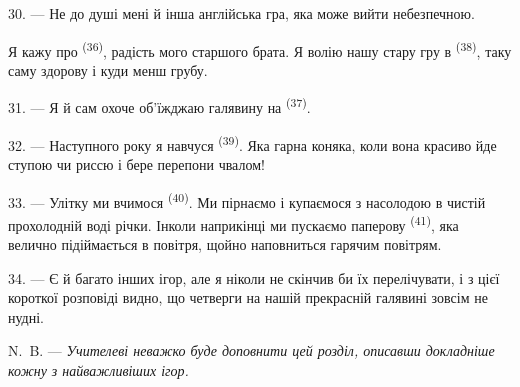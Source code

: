 30. --- Не до душі мені й інша англійська гра, яка може вийти небезпечною.

Я кажу про  \textsuperscript{(36)}, радість мого старшого брата.
Я волію нашу стару гру в  \textsuperscript{(38)}, таку саму
здорову і куди менш грубу.

\VUsaut{4.6mm}
\VUsaut{3.0mm}

31. --- Я й сам охоче об'їжджаю галявину на 
\textsuperscript{(37)}.

32. --- Наступного року я навчуся  \textsuperscript{(39)}.
Яка гарна коняка, коли вона красиво йде ступою чи риссю і бере перепони чвалом!

33. --- Улітку ми вчимося  \textsuperscript{(40)}. Ми пірнаємо і
купаємося з насолодою в чистій прохолодній воді річки. Інколи наприкінці ми
пускаємо паперову  \textsuperscript{(41)}, яка велично підіймається
в повітря, щойно наповниться гарячим повітрям.

34. --- Є й багато інших ігор, але я ніколи не скінчив би їх перелічувати, і з
цієї короткої розповіді видно, що четверги на нашій прекрасній галявині зовсім
не нудні.

N.~B. --- \textit{Учителеві неважко буде доповнити цей розділ, описавши
докладніше кожну з найважливіших ігор.}
\VUsaut{6.0mm}
\VUfilet{22mm}
